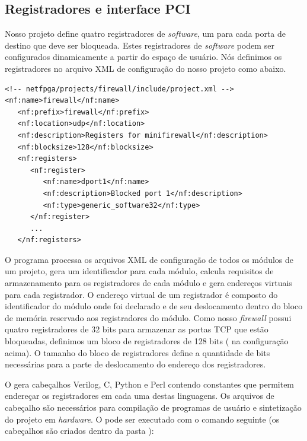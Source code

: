 \subsection{Registradores e interface PCI}
\label{sec:impl.regs}

Nosso projeto define quatro registradores de \emph{software}, um para
cada porta de destino que deve ser bloqueada.  Estes registradores de
\emph{software} podem ser configurados dinamicamente a partir do espaço
de usuário.  Nós definimos os registradores no arquivo XML de
configuração do nosso projeto como abaixo.

\begin{verbatim}
<!-- netfpga/projects/firewall/include/project.xml -->
<nf:name>firewall</nf:name>
   <nf:prefix>firewall</nf:prefix>
   <nf:location>udp</nf:location>
   <nf:description>Registers for minifirewall</nf:description>
   <nf:blocksize>128</nf:blocksize>
   <nf:registers>
      <nf:register>
         <nf:name>dport1</nf:name>
         <nf:description>Blocked port 1</nf:description>
         <nf:type>generic_software32</nf:type>
      </nf:register>
      ...
   </nf:registers>
\end{verbatim}

O programa  processa os arquivos XML de
configuração de todos os módulos de um projeto, gera um identificador
para cada módulo, calcula requisitos de armazenamento para os
registradores de cada módulo e gera endereços virtuais para cada
registrador.\footnotemark{}  O endereço virtual de um registrador é
composto do identificador do módulo onde foi declarado e de seu
deslocamento dentro do bloco de memória reservado aos registradores do
módulo.  Como nosso \emph{firewall} possui quatro registradores de 32
bits para armazenar as portas TCP que estão bloqueadas, definimos um
bloco de registradores de 128 bits ( na configuração
acima).  O tamanho do bloco de registradores define a quantidade de bits
necessárias para a parte de deslocamento do endereço dos registradores.


O  gera cabeçalhos Verilog, C, Python e Perl
contendo constantes que permitem endereçar os registradores em cada uma
destas linguagens.  Os arquivos de cabeçalho são necessários para
compilação de programas de usuário e sintetização do projeto em
\emph{hardware}.  O  pode ser executado com o
comando seguinte (os cabeçalhos são criados dentro da pasta
):

